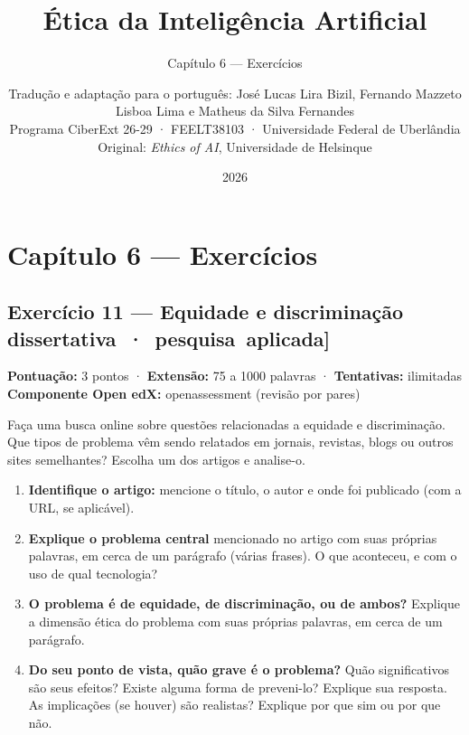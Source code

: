 \documentclass[
  11pt,
]{article}
\title{Ética da Inteligência Artificial}
\subtitle{Capítulo 6 --- Exercícios}
\author{Tradução e adaptação para o português: José Lucas Lira Bizil,
Fernando Mazzeto Lisboa Lima e Matheus da Silva Fernandes\\
Programa CiberExt 26-29 · FEELT38103 · Universidade Federal de
Uberlândia\\
Original: \emph{Ethics of AI}, Universidade de Helsinque}
\date{2026}
\renewcommand{\texttt}[1]{{\color{iaAmeixa}\small\ttfamily #1}}
\begin{document}
\maketitle

{
\hypersetup{linkcolor=iaConceitos}
\setcounter{tocdepth}{2}
\tableofcontents
}
\hypertarget{capuxedtulo-6-exercuxedcios}{%
\section{Capítulo 6 --- Exercícios}\label{capuxedtulo-6-exercuxedcios}}

\hypertarget{exercuxedcio-11-equidade-e-discriminauxe7uxe3o-dissertativa-pesquisa-aplicada}{%
\subsection{\texorpdfstring{Exercício 11 --- Equidade e discriminação
\texttt{{[}dissertativa\ ·\ pesquisa\ aplicada{]}}}{Exercício 11 --- Equidade e discriminação {[}dissertativa · pesquisa aplicada{]}}}\label{exercuxedcio-11-equidade-e-discriminauxe7uxe3o-dissertativa-pesquisa-aplicada}}

\textbf{Pontuação:} 3 pontos · \textbf{Extensão:} 75 a 1000 palavras ·
\textbf{Tentativas:} ilimitadas \textbf{Componente Open edX:}
\texttt{openassessment} (revisão por pares)

Faça uma busca online sobre questões relacionadas a equidade e
discriminação. Que tipos de problema vêm sendo relatados em jornais,
revistas, blogs ou outros sites semelhantes? Escolha um dos artigos e
analise-o.

\begin{enumerate}
\def\labelenumi{\arabic{enumi}.}
\item
  \textbf{Identifique o artigo:} mencione o título, o autor e onde foi
  publicado (com a URL, se aplicável).
\item
  \textbf{Explique o problema central} mencionado no artigo com suas
  próprias palavras, em cerca de um parágrafo (várias frases). O que
  aconteceu, e com o uso de qual tecnologia?
\item
  \textbf{O problema é de equidade, de discriminação, ou de ambos?}
  Explique a dimensão ética do problema com suas próprias palavras, em
  cerca de um parágrafo.
\item
  \textbf{Do seu ponto de vista, quão grave é o problema?} Quão
  significativos são seus efeitos? Existe alguma forma de preveni-lo?
  Explique sua resposta. As implicações (se houver) são realistas?
  Explique por que sim ou por que não.
\end{enumerate}
\end{document}
